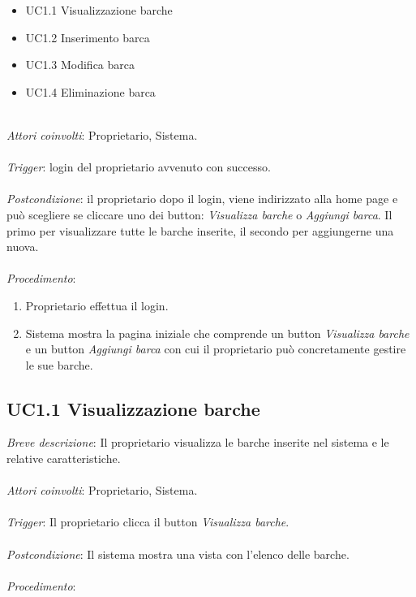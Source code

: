 \begin{itemize}
    \item UC1.1 Visualizzazione barche
    \item UC1.2 Inserimento barca
    \item UC1.3 Modifica barca
    \item UC1.4 Eliminazione barca
\end{itemize}
~\\
\emph{Attori coinvolti}: Proprietario, Sistema.\\\\
\emph{Trigger}: login del proprietario avvenuto con successo.\\\\
\emph{Postcondizione}: il proprietario dopo il login, viene indirizzato alla home page e può scegliere se cliccare uno dei button: \textit{Visualizza barche} o \textit{Aggiungi barca}. Il primo per visualizzare
tutte le barche inserite, il secondo per aggiungerne una nuova.\\\\
\emph{Procedimento}:

\begin{enumerate}
    \item Proprietario effettua il login.
    \item Sistema mostra la pagina iniziale che comprende un button \textit{Visualizza barche} e un button \textit{Aggiungi barca} con cui il proprietario può concretamente gestire le sue barche.
\end{enumerate}

\subsection{UC1.1 Visualizzazione barche}

\emph{Breve descrizione}: Il proprietario visualizza le barche inserite nel sistema e le relative caratteristiche.\\\\
\emph{Attori coinvolti}: Proprietario, Sistema.\\\\
\emph{Trigger}: Il proprietario clicca il button \textit{Visualizza barche}.\\\\
\emph{Postcondizione}: Il sistema mostra una vista con l'elenco delle barche.\\\\
\emph{Procedimento}:

